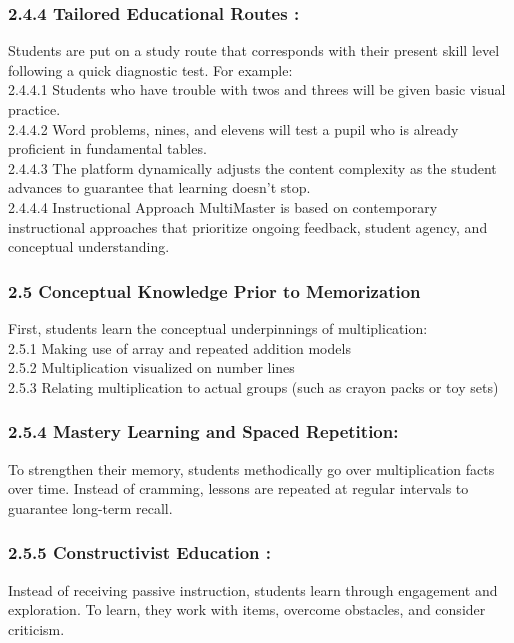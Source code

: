 \documentclass[BTech]{audiss}
\begin{document}
\subsubsection{2.4.4 Tailored Educational Routes :}
Students are put on a study route that corresponds with their present skill level following a quick diagnostic test. For example:\\
2.4.4.1 Students who have trouble with twos and threes will be given basic visual practice.\\
2.4.4.2 Word problems, nines, and elevens will test a pupil who is already proficient in fundamental tables.\\
2.4.4.3 The platform dynamically adjusts the content complexity as the student advances to guarantee that learning doesn't stop.\\
2.4.4.4 Instructional Approach MultiMaster is based on contemporary instructional approaches that prioritize ongoing feedback, student agency, and conceptual understanding.\\

\subsubsection{2.5 Conceptual Knowledge Prior to Memorization}
First, students learn the conceptual underpinnings of multiplication:\\
2.5.1 Making use of array and repeated addition models\\
2.5.2 Multiplication visualized on number lines\\
2.5.3 Relating multiplication to actual groups (such as crayon packs or toy sets)\\
\subsubsection{2.5.4 Mastery Learning and Spaced Repetition:}
To strengthen their memory, students methodically go over multiplication facts over time. Instead of cramming, lessons are repeated at regular intervals to guarantee long-term recall.

\subsubsection{2.5.5 Constructivist Education :}
Instead of receiving passive instruction, students learn through engagement and exploration. To learn, they work with items, overcome obstacles, and consider criticism.
\end{document}
